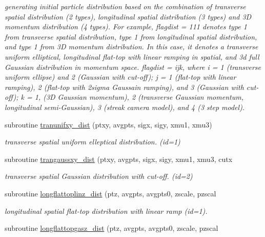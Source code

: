 \begin{DoxyCompactItemize}
\begin{DoxyCompactList}\small\item\em generating initial particle distribution based on the combination of transverse spatial distribution (2 types), longitudinal spatial distribution (3 types) and 3D momentum distribution (4 types). For example, flagdist = 111 denotes type 1 from transverse spatial distribution, type 1 from longitudinal spatial distribution, and type 1 from 3D momentum distribution. In this case, it denotes a transverse uniform elliptical, longitudinal flat-\/top with linear ramping in spatial, and 3d full Gaussian distribution in momentum space. flagdist = ijk, where i = 1 (transverse uniform ellipse) and 2 (Gaussian with cut-\/off); j = 1 (flat-\/top with linear ramping), 2 (flat-\/top with 2sigma Gaussain ramping), and 3 (Gaussian with cut-\/off); k = 1, (3D Gaussian momentum), 2 (transverse Gaussian momentum, longitudinal semi-\/\+Gaussian), 3 (streak camera model), and 4 (3 step model). \end{DoxyCompactList}\item 
subroutine \mbox{\hyperlink{namespacedistributionclass_aec8b879df17219ee41f1855623176867}{tranunifxy\+\_\+dist}} (ptxy, avgpts, sigx, sigy, xmu1, xmu3)
\begin{DoxyCompactList}\small\item\em transverse spatial uniform elleptical distribution. (id=1) \end{DoxyCompactList}\item 
subroutine \mbox{\hyperlink{namespacedistributionclass_a42ccdb5100e3e35c9424c89dcac131c1}{trangaussxy\+\_\+dist}} (ptxy, avgpts, sigx, sigy, xmu1, xmu3, cutx
\begin{DoxyCompactList}\small\item\em transverse spatial Gaussian distribution with cut-\/off. (id=2) \end{DoxyCompactList}\item 
subroutine \mbox{\hyperlink{namespacedistributionclass_a00926191e33371dc32c2fdbaca1ee2a5}{longflattoplinz\+\_\+dist}} (ptz, avgpts, avgpts0, zscale, pzscal
\begin{DoxyCompactList}\small\item\em longitudinal spatial flat-\/top distribution with linear ramp (id=1). \end{DoxyCompactList}\item 
subroutine \mbox{\hyperlink{namespacedistributionclass_a635c045c52b04bd03c076b8b8454b278}{longflattopgasz\+\_\+dist}} (ptz, avgpts, avgpts0, zscale, pzscal

\end{DoxyCompactItemize}
